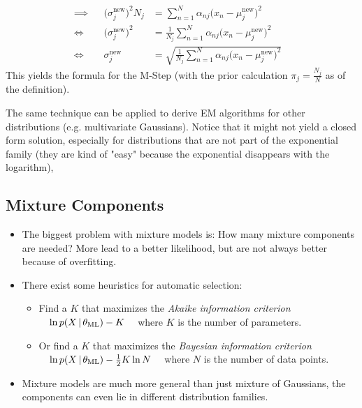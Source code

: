 \begin{align}
						\implies &  & \big(\sigma_j^\textrm{new}\big)^2 N_j    & = \sum_{n = 1}^{N} \alpha_{nj} \big(x_n - \mu_j^\textrm{new}\big)^2                                                                                                                       & \\
						\iff     &  & \big(\sigma_j^\textrm{new}\big)^2        & = \frac{1}{N_j} \sum_{n = 1}^{N} \alpha_{nj} \big(x_n - \mu_j^\textrm{new}\big)^2                                                                                                         & \\
						\iff     &  & \sigma_j^\textrm{new}                    & = \sqrt{\frac{1}{N_j} \sum_{n = 1}^{N} \alpha_{nj} \big(x_n - \mu_j^\textrm{new}\big)^2}
					\end{align}
					This yields the formula for the M-Step (with the prior calculation \( \pi_j = \frac{N_j}{N} \) as of the definition).

					The same technique can be applied to derive EM algorithms for other distributions (e.g. multivariate Gaussians). Notice that it might not yield a closed form solution, especially for distributions that are not part of the exponential family (they are kind of "easy" because the exponential disappears with the logarithm),

		\subsection{Mixture Components}
			\begin{itemize}
				\item The biggest problem with mixture models is: How many mixture components are needed? More lead to a better likelihood, but are not always better because of overfitting.
				\item There exist some heuristics for automatic selection:
					\begin{itemize}
						\item Find a \(K\) that maximizes the \emph{Akaike information criterion} \( \quad\ln p(X \,\vert\, \theta_\textrm{ML}) - K\quad \) where \(K\) is the number of parameters.
						\item Or find a \(K\) that maximizes the \emph{Bayesian information criterion} \( \quad\ln p(X \,\vert\, \theta_\textrm{ML}) - \frac{1}{2} K \ln N\quad \) where \(N\) is the number of data points.
					\end{itemize}
				\item Mixture models are much more general than just mixture of Gaussians, the components can even lie in different distribution families.
			\end{itemize}

